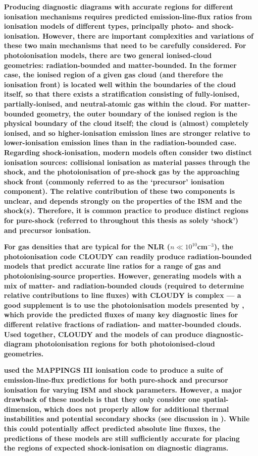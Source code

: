\textbf{Producing diagnostic diagrams with accurate regions for different ionisation mechanisms requires predicted emission-line-flux ratios from ionisation models of different types, principally photo- and shock-ionisation. However, there are important complexities and variations of these two main mechanisms that need to be carefully considered. For photoionisation models, there are two general ionised-cloud geometries: radiation-bounded and matter-bounded. In the former case, the ionised region of a given gas cloud (and therefore the ionisation front) is located well within the boundaries of the cloud itself, so that there exists a stratification consisting of fully-ionised, partially-ionised, and neutral-atomic gas within the cloud. For matter-bounded geometry, the outer boundary of the ionised region is the physical boundary of the cloud itself; the cloud is (almost) completely ionised, and so higher-ionisation emission lines are stronger relative to lower-ionisation emission lines than in the radiation-bounded case. Regarding shock-ionisation, modern models often consider two distinct ionisation sources: collisional ionisation as material passes through the shock, and the photoionisation of pre-shock gas by the approaching shock front (commonly referred to as the `precursor' ionisation component). The relative contribution of these two components is unclear, and depends strongly on the properties of the ISM and the shock(s). Therefore, it is common practice to produce distinct regions for pure-shock (referred to throughout this thesis as solely `shock') and precursor ionisation.}

\textbf{For gas densities that are typical for the NLR ($n\ll10^{10}$\;cm$^{-3}$), the photoionisation code \textsc{CLOUDY} \citep{Ferland2017} can readily produce radiation-bounded models that predict accurate line ratios for a range of gas and photoionising-source properties. However, generating models with a mix of matter- and radiation-bounded clouds (required to determine relative contributions to line fluxes) with \textsc{CLOUDY} is complex --- a good supplement is to use the photoionisation models presented by \citet{Binette1996}, which provide the predicted fluxes of many key diagnostic lines for different relative fractions of radiation- and matter-bounded clouds. Used together, \textsc{CLOUDY} and the models of \citet{Binette1996} can produce diagnostic-diagram photoionisation regions for both photoionised-cloud geometries.}

\textbf{\citet{Allen2008} used the MAPPINGS III ionisation code to produce a suite of emission-line-flux predictions for both pure-shock and precursor ionisation for varying ISM and shock parameters. However, a major drawback of these models is that they only consider one spatial-dimension, which does not properly allow for additional thermal instabilities and potential secondary shocks (see discussion in \citealt{Allen2008}). While this could potentially affect predicted absolute line fluxes, the predictions of these models are still sufficiently accurate for placing the regions of expected shock-ionisation on diagnostic diagrams.}


